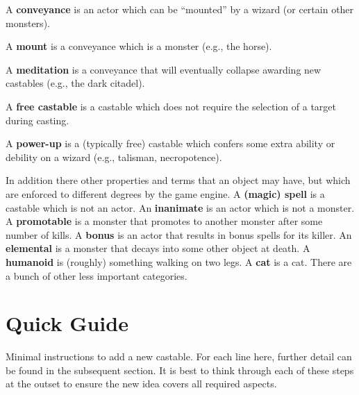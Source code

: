 \documentclass{article}
\begin{document}
A {\bf conveyance} is an actor which can be ``mounted'' by a wizard (or certain other monsters).

A {\bf mount} is a conveyance which is a monster (e.g., the horse).

A {\bf meditation} is a conveyance that will eventually collapse awarding new castables (e.g., the dark citadel).

A {\bf free castable} is a castable which does not require the selection of a target during casting.

A {\bf power-up} is a (typically free) castable which confers some extra ability or debility on a wizard (e.g., talisman, necropotence).

In addition there other properties and terms that an object may have, but which are enforced to different degrees by the game engine. A {\bf (magic) spell} is a castable which is not an actor. An {\bf inanimate} is an actor which is not a monster. A {\bf promotable} is a monster that promotes to another monster after some number of kills. A {\bf bonus} is an actor that results in bonus spells for its killer. An {\bf elemental} is a monster that decays into some other object at death. A {\bf humanoid} is (roughly) something walking on two legs. A {\bf cat} is a cat. There are a bunch of other less important categories.

\section{Quick Guide}

Minimal instructions to add a new castable.  For each line here, further detail can be found in the subsequent section. It is best to think through each of these steps at the outset to ensure the new idea covers all required aspects.
\end{document}
